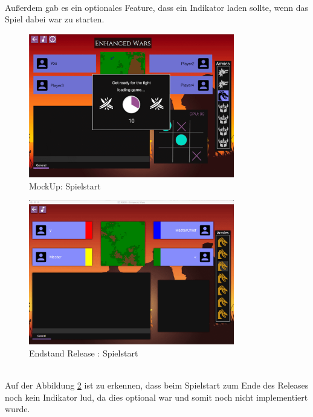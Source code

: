 \documentclass[12pt, titlepage]{scrartcl}
\newcommand{\RN}[1]{%
	\textup{\uppercase\expandafter{\romannumeral#1}}%
}
\begin{document}
			\ \\  Au{\ss}erdem gab es ein optionales Feature, dass ein Indikator laden sollte, wenn das Spiel dabei war zu starten.
			\begin{figure}[H] 
				\centering
				\includegraphics[width=0.8\textwidth]{images/mockUps/StartGame.png}
				\caption{MockUp: Spielstart}
				\label{Game_Start_2}
			\end{figure}
			\begin{figure}[H] 
				\centering
				\includegraphics[width=0.8\textwidth]{images/endOfRelease/StartGame.png}
				\caption{Endstand Release \RN{3}: Spielstart}
				\label{End_Game_Start}
			\end{figure}
			\ \\ Auf der Abbildung \ref{End_Game_Start} ist zu erkennen, dass beim Spielstart zum Ende des Releases noch kein Indikator lud, da dies optional war und somit noch nicht implementiert wurde.
\end{document}

